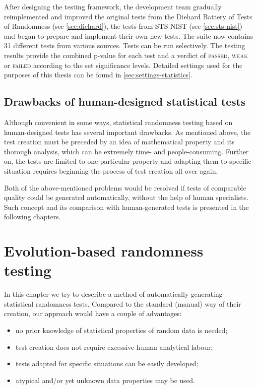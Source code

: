 \documentclass[12pt,oneside]{fithesis2}		%
\renewcommand{\_}{\leavevmode \kern0.0em\vbox{\hrule width0.4em}}
\newcommand{\squarebullet}{\textcolor{black}{\raisebox{0.15em}{\rule{4pt}{4pt}}}}
\newenvironment{myItemize}{
  \begin{itemize}[leftmargin=2em,rightmargin=1em,itemsep=\parskip ,parsep=0em,topsep=0em,partopsep=0em]
  \renewcommand{\labelitemi}{\squarebullet}
  \renewcommand{\labelitemii}{$\diamond$}
}{
  \end{itemize}
}
\begin{document}
After designing the testing framework, the development team gradually reimplemented and improved the original tests from 
the Diehard Battery of Tests of Randomness (see \autoref{sec:diehard}), 
the tests from STS NIST (see \autoref{sec:sts-nist}) and began to prepare and implement their own new tests.
The suite now contains 31 different tests from various sources. Tests can be run selectively.
The testing results provide the combined p-value for each test and a verdict of \textsc{passed}, \textsc{weak} or \textsc{failed}
according to the set significance levels.
Detailed settings used for the purposes of this thesis can be found in \autoref{sec:settings-statistics}.

\section{Drawbacks of human-designed statistical tests}
\label{sec:limits-stat-testing}

Although convenient in some ways, statistical randomness testing based on human-designed tests has several important drawbacks.
As mentioned above, the test creation must be preceded by an idea of mathematical property and its thorough analysis, 
which can be extremely time- and people-consuming. Further on, the tests are limited to one particular property and
adapting them to specific situation requires beginning the process of test creation all over again.

Both of the above-mentioned problems would be resolved if tests of comparable quality could be generated automatically, without 
the help of human specialists. Such concept and its comparison with human-generated tests is presented in the following chapters.

\chapter{Evolution-based randomness testing}
\label{chap:evo-based-testing}

In this chapter we try to describe a method of automatically generating statistical randomness tests. Compared to the standard
(manual) way of their creation, our approach would have a couple of advantages: 
\begin{myItemize}
\item no prior knowledge of statistical properties of random data is needed;
\item test creation does not require excessive human analytical labour;
\item tests adapted for specific situations can be easily developed;
\item atypical and/or yet unknown data properties may be used.
\end{myItemize}
\end{document}
